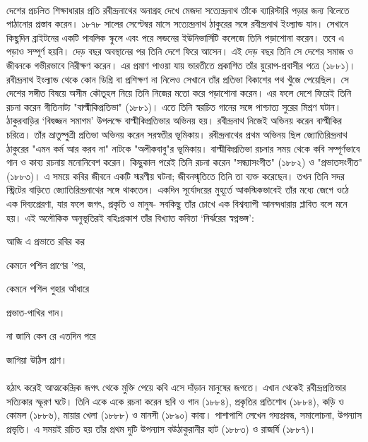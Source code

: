 \documentclass{article}
\begin{document}
\paragraph{}
দেশের প্রচলিত শিক্ষাধারার প্রতি রবীন্দ্রনাথের অনাগ্রহ দেখে মেজদা সত্যেন্দ্রনাথ তাঁকে ব্যারিস্টারি পড়ার জন্য বিলেতে পাঠানোর প্রস্তাব করেন। ১৮৭৮ সালের সেপ্টেম্বর মাসে সত্যেন্দ্রনাথ ঠাকুরের সঙ্গে রবীন্দ্রনাথ ইংল্যান্ড যান। সেখানে কিছুদিন ব্রাইটনের একটি পাবলিক স্কুলে এবং পরে লন্ডনের ইউনিভার্সিটি কলেজে তিনি পড়াশোনা করেন। তবে এ পড়াও সম্পূর্ণ হয়নি। দেড় বছর অবস্থানের পর তিনি দেশে ফিরে আসেন। এই দেড় বছর তিনি সে দেশের সমাজ ও জীবনকে গভীরভাবে নিরীক্ষণ করেন। এর প্রমাণ পাওয়া যায় ভারতীতে প্রকাশিত তাঁর য়ুরোপ-প্রবাসীর পত্রে (১৮৮১)। রবীন্দ্রনাথ ইংল্যান্ড থেকে কোন ডিগ্রি বা প্রশিক্ষণ না নিলেও সেখানে তাঁর প্রতিভা বিকাশের পথ খুঁজে পেয়েছিল। সে দেশের সঙ্গীত বিষয়ে অসীম কৌতূহল নিয়ে তিনি নিজের মতো করে পড়াশোনা করেন। এর ফলে দেশে ফিরেই তিনি রচনা করেন গীতিনাট্য "বাল্মীকিপ্রতিভা" (১৮৮১)। এতে তিনি স্বরচিত গানের সঙ্গে পাশ্চাত্য সুরের মিশ্রণ ঘটান। ঠাকুরবাড়ির ‘বিদ্বজ্জন সমাগম’ উপলক্ষে বাল্মীকিপ্রতিভার অভিনয় হয়। রবীন্দ্রনাথ নিজেই অভিনয় করেন বাল্মীকির চরিত্রে। তাঁর ভ্রাতুষ্পুত্রী প্রতিভা অভিনয় করেন সরস্বতীর ভূমিকায়। রবীন্দ্রনাথের প্রথম অভিনয় ছিল জ্যোতিরিন্দ্রনাথ ঠাকুরের "এমন কর্ম আর করব না" নাটকে "অলীকবাবু"র ভূমিকায়। বাল্মীকিপ্রতিভা রচনার সময় থেকে কবি সম্পূর্ণভাবে গান ও কাব্য রচনায় মনোনিবেশ করেন। কিছুকাল পরেই তিনি রচনা করেন "সন্ধ্যাসংগীত" (১৮৮২) ও "প্রভাতসংগীত" (১৮৮৩)। এ সময়ে কবির জীবনে একটি স্মরণীয় ঘটনা; জীবনস্মৃতিতে তিনি তা ব্যক্ত করেছেন। তখন তিনি সদর স্ট্রিটের বাড়িতে জ্যোতিরিন্দ্রনাথের সঙ্গে থাকতেন। একদিন সূর্যোদয়ের মুহূর্তে আকস্মিকভাবেই তাঁর মধ্যে জেগে ওঠে এক দিব্যপ্রেরণা, যার ফলে জগৎ, প্রকৃতি ও মানুষ- সবকিছু তাঁর চোখে এক বিশ্বব্যাপী আনন্দধারায় প্লাবিত বলে মনে হয়। এই অলৌকিক অনুভূতিরই বহিঃপ্রকাশ তাঁর বিখ্যাত কবিতা ‘নির্ঝরের স্বপ্নভঙ্গ’:

আজি এ প্রভাতে রবির কর

কেমনে পশিল প্রাণের ’পর,

কেমনে পশিল  গুহার আঁধারে

প্রভাত-পাখির গান।

না জানি কেন রে  এতদিন পরে

জাগিয়া উঠিল প্রাণ।
\paragraph{}
হঠাৎ করেই আত্মকেন্দ্রিক জগৎ থেকে মুক্তি পেয়ে কবি এসে দাঁড়ান মানুষের জগতে। এখান থেকেই রবীন্দ্রপ্রতিভার সত্যিকার স্ফূরণ ঘটে। তিনি একে একে রচনা করেন ছবি ও গান (১৮৮৪), প্রকৃতির প্রতিশোধ (১৮৮৪), কড়ি ও কোমল (১৮৮৬), মায়ার খেলা (১৮৮৮) ও মানসী (১৮৯০) কাব্য। পাশাপাশি লেখেন গদ্যপ্রবন্ধ, সমালোচনা, উপন্যাস প্রভৃতি। এ সময়ই রচিত হয় তাঁর প্রথম দুটি উপন্যাস বউঠাকুরানীর হাট (১৮৮৩) ও রাজর্ষি (১৮৮৭)।
\end{document}
